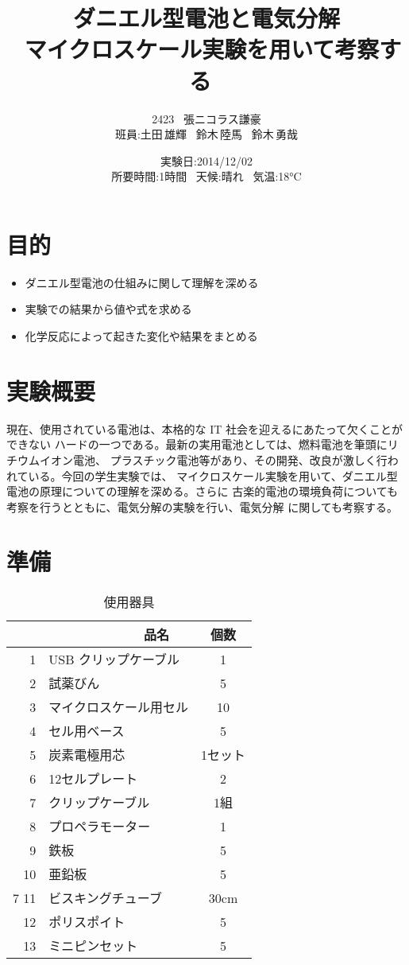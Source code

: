 \documentclass[11pt,a4j]{jarticle}
\title{ダニエル型電池と電気分解 \\ ~マイクロスケール実験を用いて考察する~} \author{2423 \ 張ニコラス謙豪 \\ 班員:土田\,雄輝 \ 鈴木\,陸馬 \ 鈴木\,勇哉} \date{実験日:2014/12/02 \\ 所要時間:1時間 \ 天候:晴れ \ 気温:18°C}
\begin{document}
\maketitle
\section{目的}
\begin{itemize}
\item ダニエル型電池の仕組みに関して理解を深める \item 実験での結果から値や式を求める
\item 化学反応によって起きた変化や結果をまとめる \end{itemize}
\section{実験概要}
現在、使用されている電池は、本格的な IT 社会を迎えるにあたって欠くことができない ハードの一つである。最新の実用電池としては、燃料電池を筆頭にリチウムイオン電池、 プラスチック電池等があり、その開発、改良が激しく行われている。今回の学生実験では、 マイクロスケール実験を用いて、ダニエル型電池の原理についての理解を深める。さらに 古楽的電池の環境負荷についても考察を行うとともに、電気分解の実験を行い、電気分解 に関しても考察する。
\newpage
\section{準備}
\begin{table}[htb]
\begin{center}
\caption{使用器具}
\begin{tabular}{|r|l|c|} \hline
\ & \ \ \ \ \ \ \ \ \ \ \ \ \ 品名 & 個数 \\ \hline 1 & USB クリップケーブル & 1 \\ \hline
2 & 試薬びん & 5 \\ \hline
3 & マイクロスケール用セル & 10 \\ \hline
4 & セル用ベース & 5 \\ \hline
5 & 炭素電極用芯 & 1セット \\ \hline
6 & 12セルプレート & 2 \\ \hline
7 & クリップケーブル & 1組 \\ \hline
8 & プロペラモーター & 1 \\ \hline
9 & 鉄板 & 5 \\ \hline
10 & 亜鉛板 & 5 \\ \hline
7
11 & ビスキングチューブ & 30cm \\ \hline 12 & ポリスポイト & 5 \\ \hline
13 & ミニピンセット & 5 \\ \hline \end{tabular}
\end{center}
\end{table}
\end{document}
